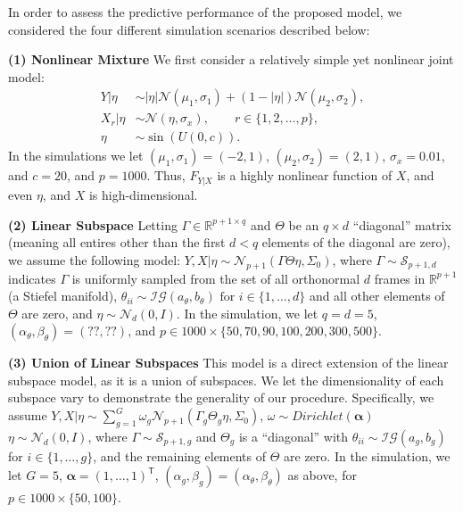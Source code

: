 \documentclass{article} %
\newcommand{\Real}{\mathbb{R}}
\providecommand{\mb}[1]{\boldsymbol{#1}}
\providecommand{\mc}[1]{\mathcal{#1}}
\newcommand{\T}{^{\ensuremath{\mathsf{T}}}}           %
\begin{document}
In order to assess the predictive performance of the proposed model, we considered the four different simulation scenarios described below: 

\textbf{(1) Nonlinear Mixture}
%
We first consider a relatively simple yet nonlinear joint model:
\begin{subequations}
\begin{align}
	Y|\eta &\sim   |\eta| \mc{N}(\mu_1,\sigma_1) + (1-|\eta|) \mc{N}(\mu_2,\sigma_2), \\
	X_r|\eta  &\sim \mc{N}(\eta, \sigma_x), \qquad r \in \{1, 2, \ldots, p\}, \\
	\eta  &\sim \sin(U(0,c)). %
\end{align}
\end{subequations}
In the simulations we let $(\mu_1,\sigma_1)=(-2,1)$, $(\mu_2,\sigma_2)=(2,1)$, $\sigma_x=0.01$, and $c=20$, and $p=1000$. Thus, $F_{Y|X}$ is a highly nonlinear function of $X$, and even $\eta$, and $X$ is high-dimensional.  

\textbf{(2) Linear Subspace} Letting $\Gamma \in \Real^{p+1 \times q}$ and $\Theta$ be an ${q \times d}$ ``diagonal'' matrix (meaning all entires other than the first $d < q$ elements of the diagonal are zero), we assume the following model:
	$Y,X |\eta \sim \mc{N}_{p+1}(\Gamma \Theta \eta ,\Sigma_0)$,
	where 	$\Gamma \sim \mc{S}_{p+1,d}$ indicates $\Gamma$ is uniformly sampled from the set of all orthonormal $d$ frames in $\Real^{p+1}$ (a Stiefel manifold), 
	$\theta_{ii} \sim \mc{IG}(a_\theta,b_\theta) \text{ for } i \in \{1, \ldots, d\}$ and all other elements of $\Theta$ are zero, and $\eta  \sim \mc{N}_d(0, I)$.  In the simulation, we let $q=d=5$,   $(\alpha_\theta,\beta_\theta)=(??,??)$, and $p \in 1000 \times \{50, 70, 90, 100, 200, 300, 500\}$.


\textbf{(3) Union of Linear Subspaces}
This model is a direct extension of the linear subspace model, as it is a union of subspaces. We let the dimensionality of each subspace vary to demonstrate the generality of our procedure.  Specifically, we assume 	$Y,X |\eta \sim \sum_{g=1}^G \omega_g \mc{N}_{p+1}(\Gamma_g \Theta_g \eta ,\Sigma_0)$, $\omega \sim Dirichlet(\mb{\alpha})$ 
	$\eta \sim \mc{N}_d(0, I)$, 
where $\Gamma \sim \mc{S}_{p+1,g}$ and $\Theta_g$ is a ``diagonal'' with $\theta_{ii} \sim \mc{IG}(a_g,b_g)$ for  $i \in \{1, \ldots, g\}$, and the remaining elements of $\Theta$ are zero.
In the simulation, we let $G=5$,  $\mb{\alpha}=(1, \ldots, 1)\T$,  $(\alpha_g,\beta_g)=(\alpha_\theta,\beta_\theta)$ as above, for  $p \in 1000 \times \{50, 100\}$.
  
\end{document}
